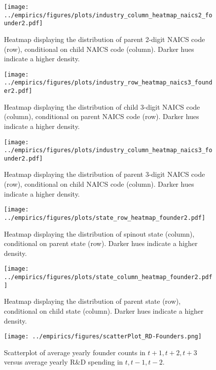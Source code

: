 \documentclass[12pt,english]{article}
\theoremstyle{remark}
\begin{document}
\begin{figure}[!htb]
	\centering
	\texttt{[image: ../empirics/figures/plots/industry\_column\_heatmap\_naics2\_founder2.pdf]}
	\caption{Heatmap displaying the distribution of parent 2-digit NAICS code (row), conditional on child NAICS code (column). Darker hues indicate a higher density.}
	\label{figure:industry_column_heatmap_naics2_founder2}
\end{figure}

\begin{figure}[!htb]
	\centering
	\texttt{[image: ../empirics/figures/plots/industry\_row\_heatmap\_naics3\_founder2.pdf]}
	\caption{Heatmap displaying the distribution of child 3-digit NAICS code (column), conditional on parent NAICS code (row). Darker hues indicate a higher density.}
	\label{figure:industry_row_heatmap_naics3_founder2}
\end{figure}

\begin{figure}[!htb]
	\centering
	\texttt{[image: ../empirics/figures/plots/industry\_column\_heatmap\_naics3\_founder2.pdf]}
	\caption{Heatmap displaying the distribution of parent 3-digit NAICS code (row), conditional on child NAICS code (column). Darker hues indicate a higher density.}
	\label{figure:industry_column_heatmap_naics3_founder2}
\end{figure}


\begin{figure}[!htb]
	\centering
	\texttt{[image: ../empirics/figures/plots/state\_row\_heatmap\_founder2.pdf]}
	\caption{Heatmap displaying the distribution of spinout state (column), conditional on parent state (row). Darker hues indicate a higher density.}
	\label{figure:state_row_heatmap_founder2}
\end{figure}

\begin{figure}[!htb]
	\centering
	\texttt{[image: ../empirics/figures/plots/state\_column\_heatmap\_founder2.pdf]}
	\caption{Heatmap displaying the distribution of parent state (row), conditional on child state (column). Darker hues indicate a higher density.}
	\label{figure:state_column_heatmap_founder2}
\end{figure}

\begin{figure}[!htb]
	\centering
	\texttt{[image: ../empirics/figures/scatterPlot\_RD-Founders.png]}
	\caption{Scatterplot of average yearly founder counts in $t+1,t+2,t+3$ versus average yearly R\&D spending in $t,t-1,t-2$.}
	\label{figure:scatterPlot_RD-Founders}
\end{figure}
\end{document}

